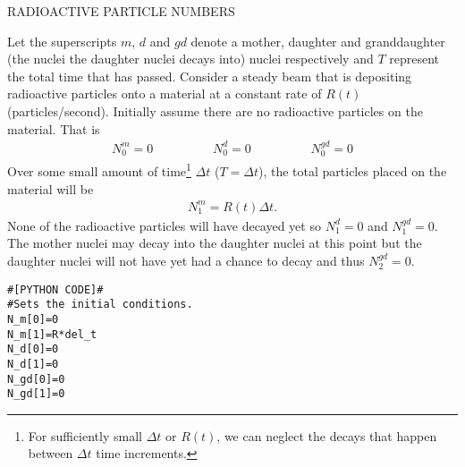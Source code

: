 \documentclass[11pt]{article}
\begin{document}
\begin{center}
	RADIOACTIVE PARTICLE NUMBERS
\end{center}

Let the superscripts $m$, $d$ and $gd$ denote a mother, daughter and granddaughter (the nuclei the daughter nuclei decays into) nuclei respectively and $T$ represent the total time that has passed. Consider a steady beam that is depositing radioactive particles onto a material at a constant rate of $R(t)$ (particles/second). Initially assume there are no radioactive particles on the material. That is
\begin{align}
N^m_0=0 \hspace{2cm} N^d_0=0 \hspace{2cm} N^{gd}_0=0
\end{align}
Over some small amount of time\footnote{For sufficiently small $\Delta t$ or $R(t)$, we can neglect the decays that happen between $\Delta t$ time increments.} $\Delta t$ ($T=\Delta t$), the total particles placed on the material will be 
\begin{align}
N^m_1=R(t)\Delta t.
\end{align} 
None of the radioactive particles will have decayed yet so $N^d_1=0$ and $N^{gd}_1=0$. The mother nuclei may decay into the daughter nuclei at this point but the daughter nuclei will not have yet had a chance to decay and thus $N^{gd}_2=0$. 

\begin{lstlisting}
#[PYTHON CODE]#
#Sets the initial conditions. 
N_m[0]=0
N_m[1]=R*del_t
N_d[0]=0
N_d[1]=0
N_gd[0]=0
N_gd[1]=0
\end{lstlisting}
\end{document}
